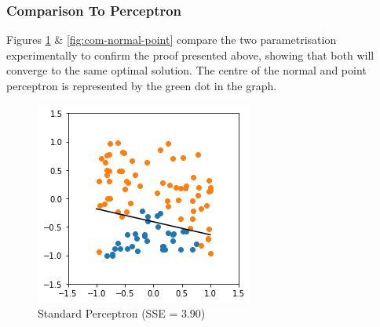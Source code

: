 \documentclass[notitlepage]{report}
\theoremstyle{definition}
\begin{document}
\subsubsection{Comparison To Perceptron}
Figures \ref{fig:com-standard-perceptron} \& \ref{fig:com-normal-point} compare the two parametrisation experimentally to confirm the proof presented above, showing that both will converge to the same optimal solution. The centre of the normal and point perceptron is represented by the green dot in the graph.\\


\begin{figure}[H]
\centering
  \begin{minipage}[b]{0.4\textwidth}
    \includegraphics[width=\textwidth]{Standard-Perceptron.png}
    \caption{Standard Perceptron (SSE = 3.90)}
    \label{fig:com-standard-perceptron}
  \end{minipage}
  \hfill
  \begin{minipage}[b]{0.4\textwidth}

\end{minipage}
\end{figure}
\end{document}
